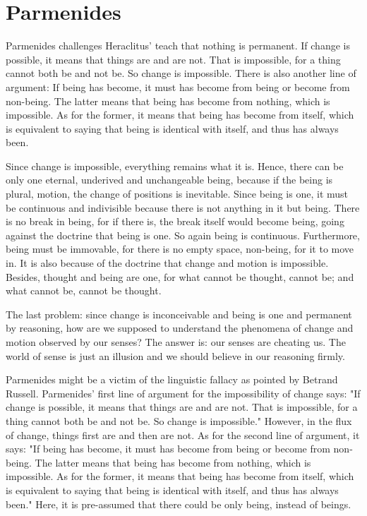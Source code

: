 \documentclass[11pt]{article}
\begin{document}
\section{Parmenides}
Parmenides challenges Heraclitus’ teach that nothing is permanent. 
If change is possible, it means that things are and are not. 
That is impossible, for a thing cannot both be and not be. 
So change is impossible. 
There is also another line of argument: 
If being has become, it must has become from being or become from non-being. 
The latter means that being has become from nothing, which is impossible. 
As for the former, it means that being has become from itself, which is equivalent to saying that being is identical with itself, and thus has always been.

\newline

Since change is impossible, everything remains what it is. 
Hence, there can be only one eternal, underived and unchangeable being, because if the being is plural, motion, the change of positions is inevitable. 
Since being is one, it must be continuous and indivisible because there is not anything in it but being. 
There is no break in being, for if there is, the break itself would become being, going against the doctrine that being is one. 
So again being is continuous. 
Furthermore, being must be immovable, for there is no empty space, non-being, for it to move in. 
It is also because of the doctrine that change and motion is impossible. 
Besides, thought and being are one, for what cannot be thought, cannot be; and what cannot be, cannot be thought.

\newline

The last problem: 
since change is inconceivable and being is one and permanent by reasoning, how are we supposed to understand the phenomena of change and motion observed by our senses? 
The answer is: 
our senses are cheating us. 
The world of sense is just an illusion and we should believe in our reasoning firmly.

\newline
Parmenides might be a victim of the linguistic fallacy as pointed by Betrand Russell. 
Parmenides' first line of argument for the impossibility of change says: 
"If change is possible, it means that things are and are not. That is impossible, for a thing cannot both be and not be. So change is impossible." 
However, in the flux of change, things first are and then are not. 
As for the second line of argument, it says: 
"If being has become, it must has become from being or become from non-being. The latter means that being has become from nothing, which is impossible. As for the former, it means that being has become from itself, which is equivalent to saying that being is identical with itself, and thus has always been." 
Here, it is pre-assumed that there could be only being, instead of beings.
\end{document}
